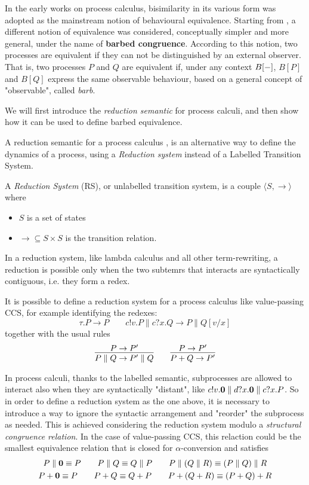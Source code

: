 In the early works on process calculus, bisimilarity in its various form was adopted as the mainstream notion of behavioural equivalence. Starting from \cite{milnerBarbedBisimulation1992}, a different notion of equivalence was considered, conceptually simpler and more general, under the name
of \textbf{barbed congruence}. According to this notion, two processes are equivalent if they can not be distinguished by an external observer. That is, two processes $P$ and $Q$ are equivalent if, under any context $B[{-}]$, $B[P]$ and $B[Q]$ express the same observable behaviour, based on a general concept of "observable", called \textit{barb}.

We will first introduce the \textit{reduction semantic} for process calculi, and then show how it can be used to define barbed equivalence. 

A reduction semantic for a process calculus \cite{milnerFunctionsProcesses1990, berryChemicalAbstractMachine1989}, is an alternative way to define the dynamics of a process, using a \textit{Reduction system} instead of a Labelled Transition System. 

A \textit{Reduction System} (RS), or unlabelled transition system, is a couple $\langle S,  \rightarrow \rangle$ where \begin{itemize}
\item $S$ is a set of states
\item $\rightarrow 	\subseteq S\times S$ is the transition relation.
\end{itemize} 

In a reduction system, like lambda calculus and all other term-rewriting, a reduction is possible only when the two subtemrs that interacts are syntactically contiguous, i.e. they form a redex. 

It is possible to define a reduction system for a process calculus like value-passing CCS, for example identifying the redexes:
\[ \tau.P \rightarrow P \qquad c!v.P \parallel c?x.Q \rightarrow P \parallel Q[v/x]\]
together with the usual rules
\[ \infer{P \parallel Q \rightarrow P'\parallel Q}{P \rightarrow P'}
\qquad
\infer{P + Q \rightarrow P'}{P \rightarrow P'}\]

In process calculi, thanks to the labelled semantic, subprocesses are allowed to interact also when they are syntactically "distant", like $c!v.\mathbf{0} \parallel d?x.\mathbf{0} \parallel c?x.P$. So in order to define a reduction system as the one above, it is necessary to introduce a way to ignore the syntactic arrangement and "reorder" the subprocess as needed.  This is achieved considering the reduction system modulo a \textit{structural congruence relation}. In the case of value-passing CCS, this relaction could be the smallest equivalence relation that is closed for $\alpha$-conversion and satisfies  
\begin{gather*}
P\parallel\mathbf{0} \equiv P \qquad P\parallel Q \equiv Q \parallel P \qquad P\parallel(Q\parallel R) \equiv (P \parallel Q) \parallel R \\
P + \mathbf{0} \equiv P \qquad P + Q \equiv Q + P \qquad P + (Q + R) \equiv (P + Q) + R
\end{gather*}

